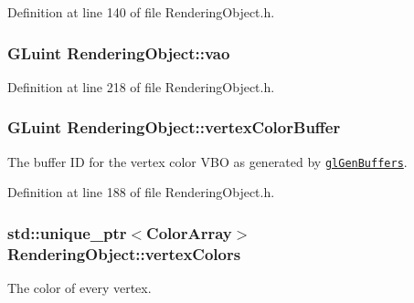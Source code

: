 Definition at line 140 of file Rendering\+Object.\+h.

\hypertarget{class_rendering_object_a96dd05670a977a949514a2c490c1c867}{}
\subsubsection[{vao}]{\setlength{\rightskip}{0pt plus 5cm}G\+Luint Rendering\+Object\+::vao\hspace{0.3cm}{\ttfamily [protected]}}\label{class_rendering_object_a96dd05670a977a949514a2c490c1c867}


Definition at line 218 of file Rendering\+Object.\+h.

\hypertarget{class_rendering_object_aeb014a4ef24e2fc4665a769241660cad}{}
\subsubsection[{vertex\+Color\+Buffer}]{\setlength{\rightskip}{0pt plus 5cm}G\+Luint Rendering\+Object\+::vertex\+Color\+Buffer\hspace{0.3cm}{\ttfamily [protected]}}\label{class_rendering_object_aeb014a4ef24e2fc4665a769241660cad}


The buffer I\+D for the vertex color V\+B\+O as generated by \href{https://www.opengl.org/sdk/docs/man/html/glGenBuffers.xhtml}{\tt gl\+Gen\+Buffers}. 



Definition at line 188 of file Rendering\+Object.\+h.

\hypertarget{class_rendering_object_a65fc52e665791ce55e43106b603e917a}{}
\subsubsection[{vertex\+Colors}]{\setlength{\rightskip}{0pt plus 5cm}std\+::unique\+\_\+ptr$<${\bf Color\+Array}$>$ Rendering\+Object\+::vertex\+Colors\hspace{0.3cm}{\ttfamily [protected]}}\label{class_rendering_object_a65fc52e665791ce55e43106b603e917a}


The color of every vertex. 



